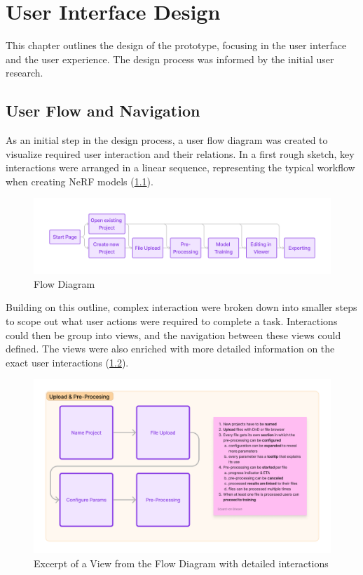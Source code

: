%
\chapter{User Interface Design}
\label{sec:design}

This chapter outlines the design of the prototype, focusing in the user interface and the user experience. The design process was informed by the initial user research.

\section{User Flow and Navigation}
\label{sec:design:flow}

As an initial step in the design process, a user flow diagram was created to visualize required user interaction and their relations. 
In a first rough sketch, key interactions were arranged in a linear sequence, representing the typical workflow when creating NeRF models (\ref{fig:design:flow-1}).

\begin{figure}[htb]
	\includegraphics[width=\textwidth]{figures/flow-1.png}
	\caption{Flow Diagram}
	\label{fig:design:flow-1}
\end{figure}

Building on this outline, complex interaction were broken down into smaller steps to scope out what user actions were required to complete a task.
Interactions could then be group into views, and the navigation between these views could defined.
The views were also enriched with more detailed information on the exact user interactions (\ref{fig:design:flow-2}).

\begin{figure}[htb]
  \includegraphics[width=\textwidth]{figures/flow-2.png}
  \caption{Excerpt of a View from the Flow Diagram with detailed interactions}
  \label{fig:design:flow-2}
\end{figure}

